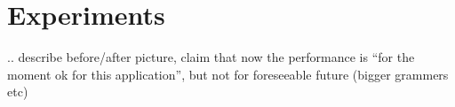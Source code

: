 
\section{Experiments} 
\label{sec:experiments}


.. describe before/after picture, claim that now the performance is
``for the moment ok for this application'', but not for foreseeable
future (bigger grammers etc)





